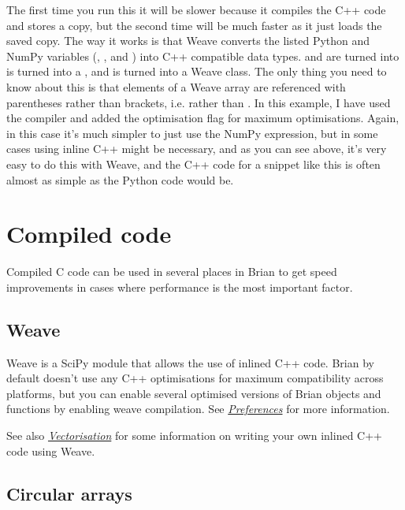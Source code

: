 \documentclass[letterpaper,10pt,english]{manual}
\begin{document}
The first time you run this it will be slower because it compiles the
C++ code and stores a copy, but the second time will be much faster as
it just loads the saved copy. The way it works is that Weave converts
the listed Python and NumPy variables (, , 
and ) into C++ compatible data types.  and
 are turned into  is turned into
a , and  is turned into a Weave
 class. The only thing you need to know about this is that
elements of a Weave array are referenced with parentheses rather than
brackets, i.e.  rather than . In
this example, I have used the  compiler and added the optimisation
flag  for maximum optimisations. Again, in this case it's much
simpler to just use the  NumPy expression,
but in some cases using inline C++ might be necessary, and as you can see
above, it's very easy to do this with Weave, and the C++ code for a
snippet like this is often almost as simple as the Python code would be.

\resetcurrentobjects


\hypertarget{compiled-code}{}\section{Compiled code}

Compiled C code can be used in several places in Brian to get speed improvements in cases where performance
is the most important factor.


\subsection{Weave}

Weave is a SciPy module that allows the use of inlined C++ code. Brian by default doesn't use any C++
optimisations for maximum compatibility across platforms, but you can enable several optimised
versions of Brian objects and functions by enabling weave compilation. See \hyperlink{preferences}{\emph{Preferences}}
for more information.

See also \hyperlink{efficiency-vectorisation}{\emph{Vectorisation}} for some information on writing your own inlined C++ code
using Weave.


\subsection{Circular arrays}
\end{document}
